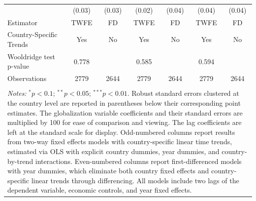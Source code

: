 \begin{table}[!htbp]
\begin{tabular}{@{\extracolsep{2pt}}lcccccc}
 & (0.03) & (0.03) & (0.02) & (0.04) & (0.04) & (0.04) \\ 
Estimator & TWFE & FD & TWFE & FD & TWFE & FD \\ 
Country-Specific Trends & Yes & No & Yes & No & Yes & No \\ 
Wooldridge test p-value & 0.778 &  & 0.585 &  & 0.594 &  \\ 
Observations & 2779 & 2644 & 2779 & 2644 & 2779 & 2644 \\ 
\hline 
\hline \\[-1.8ex] 
\multicolumn{7}{l}{\parbox{1.0\linewidth}{\textit{Notes:} $^{*}p<0.1$; $^{**}
            p<0.05$; $^{***} p<0.01$. Robust standard errors clustered at the
            country level are reported in parentheses below their corresponding
            point estimates. The globalization variable coefficients and their
            standard errors are multiplied by 100 for ease of comparison and
            viewing. The lag coefficients are left at the standard scale for
            display. Odd-numbered columns report results from two-way fixed
            effects models with country-specific linear time trends, estimated
            via OLS with explicit country dummies, year dummies, and
            country-by-trend interactions. Even-numbered columns report
            first-differenced models with year dummies, which eliminate both
            country fixed effects and country-specific linear trends through
            differencing. All models include two lags of the dependent variable,
            economic controls, and year fixed effects.}} \\ 
\end{tabular} 
\end{table} 
